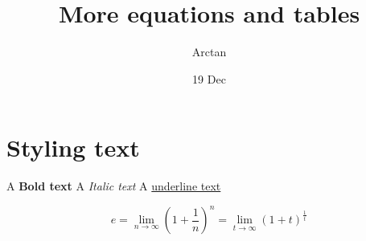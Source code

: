 \documentclass{article}
\title{More equations and tables}
\author{Arctan}
\date{19 Dec}
\begin{document}
\maketitle

\section{Styling text}

A \textbf{Bold text}
A \textit{Italic text}
A \underline{underline text}

    \begin{equation}
        e = \lim_{n\to\infty}\left(1+\frac{1}{n}\right)^n
          = \lim_{t\to\infty}(1+t)^\frac{1}{t}
    \end{equation}
\end{document}
